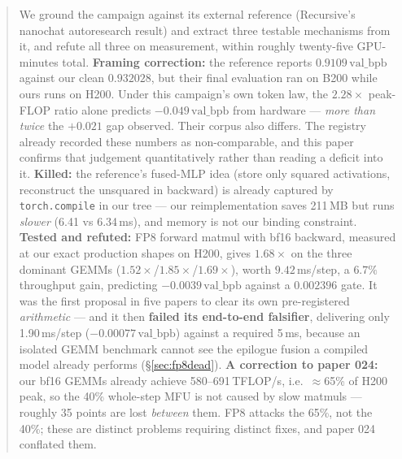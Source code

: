 \documentclass{article}
\newcommand{\vb}{\mathrm{val\_bpb}}
\begin{document}
\printAffiliationsAndNotice{}

\begin{abstract}
We ground the campaign against its external reference (Recursive's nanochat autoresearch result) and extract three testable mechanisms from it, and refute all three on measurement, within roughly twenty-five GPU-minutes total. \textbf{Framing correction:} the reference reports $0.9109$\,$\vb$ against our clean $0.932028$, but their final evaluation ran on B200 while ours runs on H200. Under this campaign's own token law, the $2.28\times$ peak-FLOP ratio alone predicts $-0.049$\,$\vb$ from hardware --- \emph{more than twice} the $+0.021$ gap observed. Their corpus also differs. The registry already recorded these numbers as non-comparable, and this paper confirms that judgement quantitatively rather than reading a deficit into it. \textbf{Killed:} the reference's fused-MLP idea (store only squared activations, reconstruct the unsquared in backward) is already captured by \texttt{torch.compile} in our tree --- our reimplementation saves 211\,MB but runs \emph{slower} (6.41 vs 6.34\,ms), and memory is not our binding constraint. \textbf{Tested and refuted:} FP8 forward matmul with bf16 backward, measured at our exact production shapes on H200, gives $1.68\times$ on the three dominant GEMMs ($1.52\times$/$1.85\times$/$1.69\times$), worth $9.42$\,ms/step, a $6.7\%$ throughput gain, predicting $\mathbf{-0.0039}$\,$\vb$ against a $0.002396$ gate. It was the first proposal in five papers to clear its own pre-registered \emph{arithmetic} --- and it then \textbf{failed its end-to-end falsifier}, delivering only 1.90\,ms/step ($-0.00077$\,$\vb$) against a required 5\,ms, because an isolated GEMM benchmark cannot see the epilogue fusion a compiled model already performs (\S\ref{sec:fp8dead}). \textbf{A correction to paper 024:} our bf16 GEMMs already achieve 580--691\,TFLOP/s, i.e.\ $\approx$65\% of H200 peak, so the 40\% whole-step MFU is not caused by slow matmuls --- roughly 35 points are lost \emph{between} them. FP8 attacks the 65\%, not the 40\%; these are distinct problems requiring distinct fixes, and paper 024 conflated them.
\end{abstract}
\end{document}
